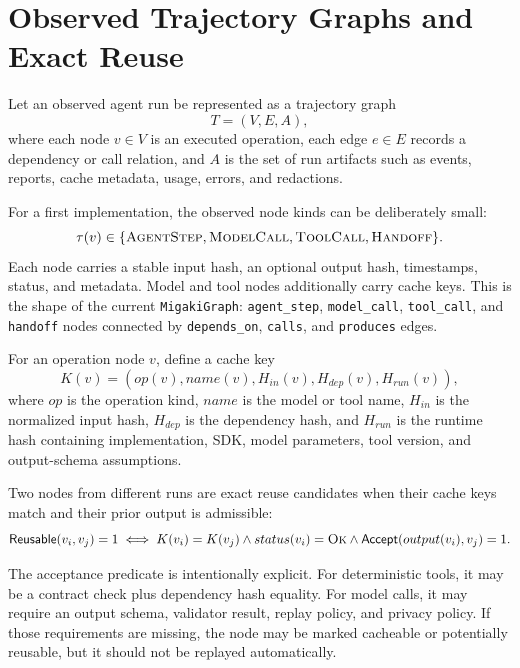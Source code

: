 \section{Observed Trajectory Graphs and Exact Reuse}

Let an observed agent run be represented as a trajectory graph
\begin{equation}
T = (V,E,A),
\end{equation}
where each node $v \in V$ is an executed operation, each edge $e \in E$ records a dependency or call relation, and $A$ is the set of run artifacts such as events, reports, cache metadata, usage, errors, and redactions.

For a first implementation, the observed node kinds can be deliberately small:
\begin{equation}
\tau(v) \in \{\textsc{AgentStep}, \textsc{ModelCall}, \textsc{ToolCall}, \textsc{Handoff}\}.
\end{equation}
Each node carries a stable input hash, an optional output hash, timestamps, status, and metadata. Model and tool nodes additionally carry cache keys. This is the shape of the current \texttt{MigakiGraph}: \texttt{agent\_step}, \texttt{model\_call}, \texttt{tool\_call}, and \texttt{handoff} nodes connected by \texttt{depends\_on}, \texttt{calls}, and \texttt{produces} edges.

\begin{definition}
For an operation node $v$, define a cache key
\begin{equation}
K(v)=(op(v), name(v), H_{in}(v), H_{dep}(v), H_{run}(v)),
\end{equation}
where $op$ is the operation kind, $name$ is the model or tool name, $H_{in}$ is the normalized input hash, $H_{dep}$ is the dependency hash, and $H_{run}$ is the runtime hash containing implementation, SDK, model parameters, tool version, and output-schema assumptions.
\end{definition}

Two nodes from different runs are exact reuse candidates when their cache keys match and their prior output is admissible:
\begin{equation}
\mathsf{Reusable}(v_i, v_j)=1 \iff
K(v_i)=K(v_j) \wedge
status(v_i)=\textsc{Ok} \wedge
\mathsf{Accept}(output(v_i), v_j)=1.
\end{equation}

The acceptance predicate is intentionally explicit. For deterministic tools, it may be a contract check plus dependency hash equality. For model calls, it may require an output schema, validator result, replay policy, and privacy policy. If those requirements are missing, the node may be marked cacheable or potentially reusable, but it should not be replayed automatically.

